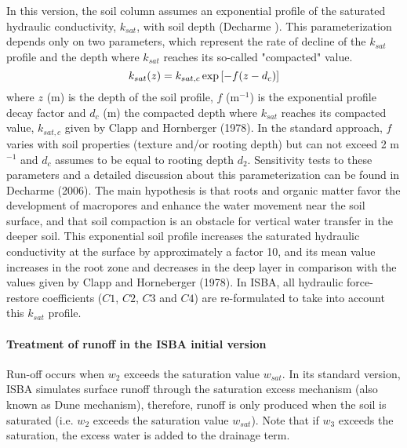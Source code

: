 In this version, the soil column assumes an exponential profile of the saturated 
hydraulic conductivity, $k_{sat}$, with soil depth (Decharme ). This parameterization 
depends only on two parameters, which represent the rate of decline of the  $k_{sat}$ profile and the 
depth where  $k_{sat}$ reaches its so-called "compacted" value. 
%
\begin{equation}
  k_{sat}(z) = k_{sat,c} \, {\rm exp}\left[-f(z-d_c)\right]
\end{equation}
%
where $z$ (m) is the depth of the soil profile, $f$ (m$^{-1}$) 
is the exponential profile decay factor and 
$d_c$ (m) the compacted depth where $k_{sat}$ reaches its compacted 
value, $k_{sat,c}$ given by Clapp and 
Hornberger (1978). In the standard approach, $f$ varies with soil properties (texture and/or 
rooting depth) but can not exceed 2 m$^{-1}$ and $d_c$ assumes to be equal to rooting depth $d_2$. 
Sensitivity tests to these parameters and a detailed discussion about this parameterization can 
be found in Decharme \etal (2006)\nocite{Decharme2006}. 
The main hypothesis is that roots and organic matter favor the development of 
macropores and enhance the water movement near the soil surface, and that soil compaction is 
an obstacle for vertical water transfer in the deeper soil. This exponential soil profile increases 
the saturated hydraulic conductivity at the surface by approximately a factor 10, and its mean 
value increases in the root zone and decreases in the deep layer in comparison with the values 
given by Clapp and Horneberger (1978)\nocite{Clapp1978}. In ISBA, all
hydraulic force-restore coefficients 
($C1$, $C2$, $C3$ and $C4$) are re-formulated to take into account this $k_{sat}$ profile.



\paragraph{Treatment of runoff in the ISBA initial version}

Run-off occurs when  $w_2$ exceeds the saturation value $w_{sat}$.
In its standard version, ISBA simulates surface runoff through 
the saturation excess mechanism (also known as Dune mechanism), 
therefore, runoff is only produced when the soil is saturated 
(i.e. $w_2$ exceeds the saturation value $w_{sat}$). Note that if $w_3$ exceeds the saturation,
the excess water is added to the drainage term.

